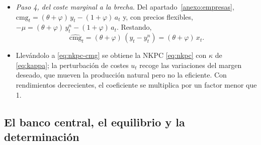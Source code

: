 \documentclass[11pt]{article}
\begin{document}
\begin{itemize}
\begin{equation}
  \end{equation}
\item \emph{Paso 4, del coste marginal a la brecha}. Del apartado~\ref{anexo:empresas}, $\mathrm{cmg}_t=(\theta+\varphi)\,y_t-(1+\varphi)\,a_t$ y, con precios flexibles, $-\mu=(\theta+\varphi)\,y^n_t-(1+\varphi)\,a_t$. Restando,
  $$\widehat{\mathrm{cmg}}_t=(\theta+\varphi)\,(y_t-y^n_t)=(\theta+\varphi)\,x_t.$$
\item Llevándolo a \eqref{eq:nkpc-cmg} se obtiene la NKPC \eqref{eq:nkpc} con $\kappa$ de \eqref{eq:kappa}; la perturbación de costes $u_t$ recoge las variaciones del margen deseado, que mueven la producción natural pero no la eficiente. Con rendimientos decrecientes, el coeficiente se multiplica por un factor menor que 1\nocite{Gali2015Monetary}. \findemo
\end{itemize}

\subsection{El banco central, el equilibrio y la determinación}\label{anexo:determinacion}
\end{document}
